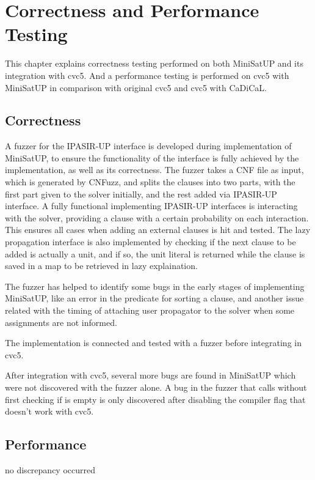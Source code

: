 \chapter{Correctness and Performance Testing}

This chapter explains correctness testing performed on both MiniSatUP and its integration with cvc5. And a performance testing is performed on cvc5 with MiniSatUP in comparison with original cvc5 and cvc5 with CaDiCaL.

\section{Correctness}


A fuzzer for the IPASIR-UP interface is developed during implementation of MiniSatUP, to ensure the functionality of the interface is fully achieved by the implementation, as well as its correctness. The fuzzer takes a CNF file as input, which is generated by CNFuzz, and splits the clauses into two parts, with the first part given to the solver initially, and the rest added via IPASIR-UP interface. A fully functional  implementing IPASIR-UP interfaces is interacting with the solver, providing a clause with a certain probability on each interaction. This ensures all cases when adding an external clauses is hit and tested. The lazy propagation interface is also implemented by checking if the next clause to be added is actually a unit, and if so, the unit literal is returned while the clause is saved in a map to be retrieved in lazy explaination.


The fuzzer has helped to identify some bugs in the early stages of implementing MiniSatUP, like an error in the predicate for sorting a clause, and another issue related with the timing of attaching user propagator to the solver when some assignments are not informed.

The implementation is connected and tested with a fuzzer before integrating in cvc5.


After integration with cvc5, several more bugs are found in MiniSatUP which were not discovered with the fuzzer alone. A bug in the fuzzer that calls  without first checking if  is empty is only discovered after disabling the compiler flag  that doesn't work with cvc5.


\section{Performance}


no discrepancy occurred


